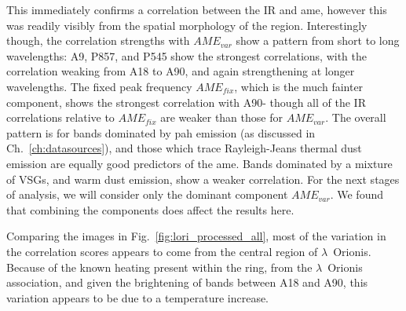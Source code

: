      This immediately confirms a correlation between the IR and \acrshort{ame}, however this was readily visibly from the spatial morphology of the region. Interestingly though, the correlation strengths with $AME_{var}$ show a pattern from short to long wavelengths: A9, P857, and P545 show the strongest correlations, with the correlation weaking from A18 to A90, and again strengthening at longer wavelengths. The fixed peak frequency $AME_{fix}$, which is the much fainter component, shows the strongest correlation with A90- though all of the IR correlations relative to $AME_{fix}$ are weaker than those for $AME_{var}$. The overall pattern is for bands dominated by \acrshort{pah} emission (as discussed in Ch.~\ref{ch:datasources}), and those which trace Rayleigh-Jeans thermal dust emission are equally good predictors of the \acrshort{ame}. Bands dominated by a mixture of VSGs, and warm dust emission, show a weaker correlation. For the next stages of analysis, we will consider only the dominant component $AME_{var}$. We found that combining the components does affect the results here.

     Comparing the images in Fig.~\ref{fig:lori_processed_all}, most of the variation in the correlation scores appears to come from the central region of $\lambda$~Orionis. Because of the known heating present within the ring, from the $\lambda$~Orionis association, and given the brightening of bands between A18 and A90, this variation appears to be due to a temperature increase.
